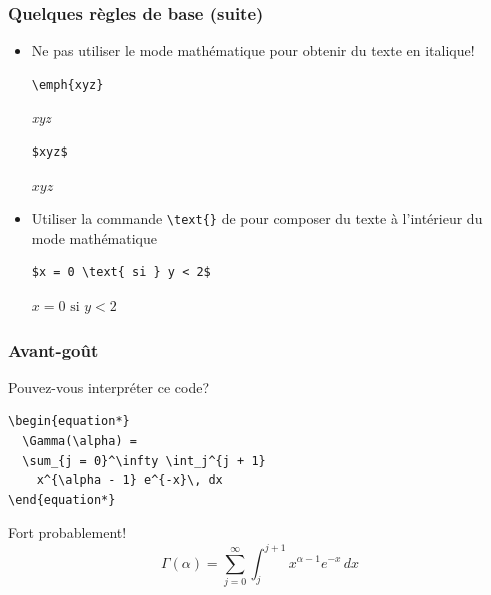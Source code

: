 \begin{frame}[fragile]
  \frametitle{Quelques règles de base (suite)}
  \begin{itemize}
  \item \alert{Ne pas} utiliser le mode mathématique pour obtenir du
    texte en italique!
    \begin{demo}
      \begin{texample}
\begin{lstlisting}
\emph{xyz}
\end{lstlisting}
        \producing
        \rmfamily\emph{xyz}
      \end{texample}
      \begin{texample}
\begin{lstlisting}
$xyz$
\end{lstlisting}
        \producing
        $xyz$
      \end{texample}
    \end{demo}
  \item Utiliser la commande \verb=\text{}= de  pour
    composer du texte à l'intérieur du mode mathématique
    \begin{demo}
      \begin{texample}
\begin{lstlisting}
$x = 0 \text{ si } y < 2$
\end{lstlisting}
        \producing
        $x = 0 \text{ si } y < 2$
      \end{texample}
    \end{demo}
  \end{itemize}
\end{frame}

\begin{frame}[fragile]
  \frametitle{Avant-goût}

  Pouvez-vous interpréter ce code?
\begin{lstlisting}
\begin{equation*}
  \Gamma(\alpha) =
  \sum_{j = 0}^\infty \int_j^{j + 1}
    x^{\alpha - 1} e^{-x}\, dx
\end{equation*}
\end{lstlisting}
  \vspace{18pt}
  \pause

  Fort probablement!
  \begin{equation*}
    \Gamma(\alpha) =
    \sum_{j = 0}^\infty \int_j^{j + 1} x^{\alpha - 1} e^{-x}\, dx
  \end{equation*}
\end{frame}

